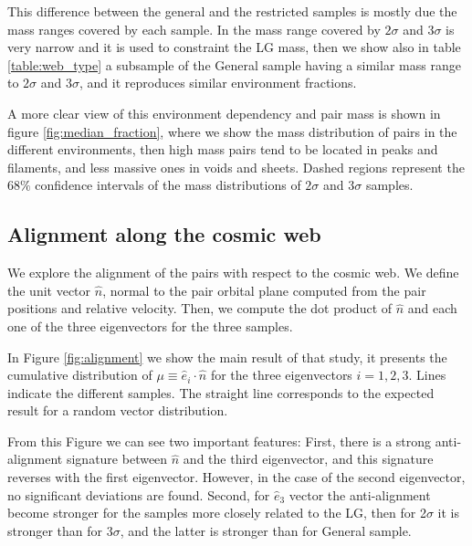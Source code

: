\documentclass{emulateapj}
\begin{document}
This difference between the general and the restricted samples is mostly due 
the mass ranges covered by each sample. 
In \citet{lganalogues} the mass range covered by $2\sigma$ and $3\sigma$ 
is very narrow and it is used to constraint the LG mass, then we show 
also in table \ref{table:web_type} a subsample of the General sample
having a similar mass range to $2\sigma$ and $3\sigma$, and it reproduces 
similar environment fractions.

A more clear view of this environment dependency and pair mass is shown in
figure \ref{fig:median_fraction}, where we show the mass distribution of pairs
in the different environments, then high mass pairs tend to be located in 
peaks and filaments, and less massive ones in voids and sheets.
Dashed regions represent the $68\%$ confidence intervals of the mass 
distributions of $2\sigma$ and $3\sigma$ samples.


\subsection{Alignment along the cosmic web}

We explore the alignment of the pairs with respect to the cosmic
web. 
We define the unit vector $\hat{n}$, normal to the pair orbital plane 
computed from the pair positions and relative velocity.
Then, we compute the dot product of $\hat{n}$ and each one of
the three eigenvectors for the three samples. 

In Figure
\ref{fig:alignment} we show the main result of that study, it
presents the cumulative distribution of
$\mu\equiv\hat{e}_i\cdot\hat{n}$ for the three eigenvectors $i=1,2,3$. 
Lines indicate the different samples.
The straight line corresponds to the expected result for a
random vector distribution. 

From this Figure we can see two important features:
First, there is a strong anti-alignment signature between $\hat{n}$ 
and the third eigenvector, and this signature reverses with the first eigenvector.
However, in the case of the second eigenvector, no significant deviations are found.
Second, for $\hat{e}_3$ vector the anti-alignment become stronger for 
the samples more closely related to the LG, then for 2$\sigma$ it is 
stronger than for 3$\sigma$, and the latter is stronger than for General 
sample. 

\end{document}
